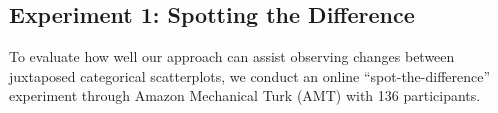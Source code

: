 %
%
%

\subsection{Experiment 1: Spotting the Difference}
\label{subsec:onlinestudy1}

To evaluate how well our approach can assist observing changes between juxtaposed categorical scatterplots, we conduct an online ``spot-the-difference'' experiment through Amazon Mechanical Turk (AMT) with 136 participants.

